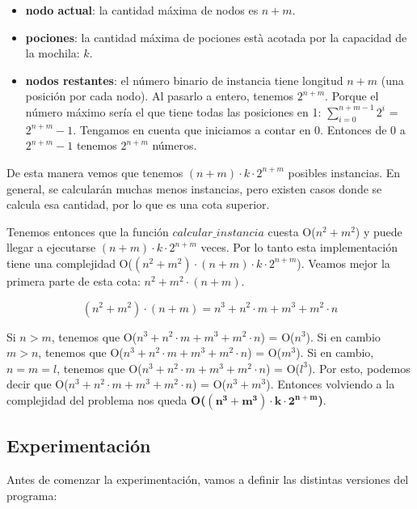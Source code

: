 \begin{itemize}
	\item \textbf{nodo actual}: la cantidad máxima de nodos es $n+m$.
	\item \textbf{pociones}: la cantidad máxima de pociones està acotada por la capacidad de la mochila: $k$.
	\item \textbf{nodos restantes}: el número binario de instancia tiene longitud $n+m$ (una posición por cada nodo). Al pasarlo a entero, tenemos $2^{n+m}$. Porque el número máximo sería el que tiene todas las posiciones en 1: $\sum_{i=0}^{n+m-1}2^i$ = $2^{n+m}-1$. Tengamos en cuenta que iniciamos a contar en 0. Entonces de 0 a $2^{n+m}-1$ tenemos $2^{n+m}$ números.
\end{itemize}

\par De esta manera vemos que tenemos $(n+m) \cdot k \cdot 2^{n+m}$ posibles instancias. En general, se calcularán muchas menos instancias, pero existen casos donde se calcula esa cantidad, por lo que es una cota superior.

\par Tenemos entonces que la función $calcular\_instancia$ cuesta O($n^2 + m^2$) y puede llegar a ejecutarse $(n+m) \cdot k \cdot 2^{n+m}$ veces. Por lo tanto esta implementación tiene una complejidad O($(n^2 + m^2) \cdot (n+m) \cdot k \cdot 2^{n+m}$). Veamos mejor la primera parte de esta cota: $n^2 + m^2 \cdot (n+m)$.

\begin{equation}
	(n^2 + m^2) \cdot (n+m) = n^3 + n^2 \cdot m + m^3 + m^2 \cdot n
\end{equation}

Si $n > m$, tenemos que O($n^3 + n^2 \cdot m + m^3 + m^2 \cdot n$) = O($n^3$). Si en cambio $m > n$, tenemos que O($n^3 + n^2 \cdot m + m^3 + m^2 \cdot n$) = O($m^3$). Si en cambio, $n = m = l$, tenemos que O($n^3 + n^2 \cdot m + m^3 + m^2 \cdot n$) = O($l^3$). Por esto, podemos decir que O($n^3 + n^2 \cdot m + m^3 + m^2 \cdot n$) = O($n^3 + m^3$). Entonces volviendo a la complejidad del problema nos queda \textbf{O($\boldsymbol{(n^3 + m^3) \cdot k \cdot 2^{n+m}}$)}.



\subsection{Experimentación}
\label{subsec: ejercicio1_experimentacion}

\par Antes de comenzar la experimentación, vamos a definir las distintas versiones del programa:

